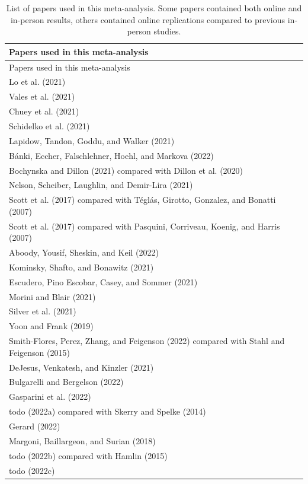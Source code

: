 \documentclass[
  man,floatsintext]{apa6}
\begin{document}
\begin{longtable}[]{@{}l@{}}
\caption{\label{tab:list}List of papers used in this meta-analysis. Some papers contained both online and in-person results, others contained online replications compared to previous in-person studies.}\tabularnewline
\toprule()
Papers used in this meta-analysis \\
\midrule()
\endfirsthead
\toprule()
Papers used in this meta-analysis \\
\midrule()
\endhead
Lo et al. (2021) \\
Vales et al. (2021) \\
Chuey et al. (2021) \\
Schidelko et al. (2021) \\
Lapidow, Tandon, Goddu, and Walker (2021) \\
Bánki, Eccher, Falschlehner, Hoehl, and Markova (2022) \\
Bochynska and Dillon (2021) compared with Dillon et al. (2020) \\
Nelson, Scheiber, Laughlin, and Demir-Lira (2021) \\
Scott et al. (2017) compared with Téglás, Girotto, Gonzalez, and Bonatti (2007) \\
Scott et al. (2017) compared with Pasquini, Corriveau, Koenig, and Harris (2007) \\
Aboody, Yousif, Sheskin, and Keil (2022) \\
Kominsky, Shafto, and Bonawitz (2021) \\
Escudero, Pino Escobar, Casey, and Sommer (2021) \\
Morini and Blair (2021) \\
Silver et al. (2021) \\
Yoon and Frank (2019) \\
Smith-Flores, Perez, Zhang, and Feigenson (2022) compared with Stahl and Feigenson (2015) \\
DeJesus, Venkatesh, and Kinzler (2021) \\
Bulgarelli and Bergelson (2022) \\
Gasparini et al. (2022) \\
todo (2022a) compared with Skerry and Spelke (2014) \\
Gerard (2022) \\
Margoni, Baillargeon, and Surian (2018) \\
todo (2022b) compared with Hamlin (2015) \\
todo (2022c) \\
\bottomrule()
\end{longtable}
\end{document}
